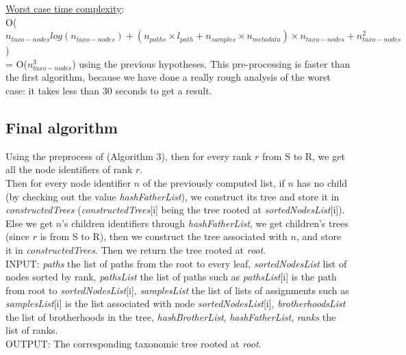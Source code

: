 \documentclass{report}
\begin{document}
\uline{Worst case time complexity}:\\
O($n_{taxo-nodes}log(n_{taxo-nodes}) + (n_{paths} \times l_{path} + n_{samples} \times n_{metadata}) \times n_{taxo-nodes} + n_{taxo-nodes}^{2}$)\\
= O($n_{taxo-nodes}^{3}$) using the previous hypotheses. This pre-processing is faster than the first algorithm, because we have done a really rough analysis of the worst case: it takes less than $30$ seconds to get a result.\\

\subsection{Final algorithm}

Using the preprocess of (Algorithm 3), then for every rank $r$ from S to R, we get all the node identifiers of rank $r$.\\

Then for every node identifier $n$ of the previously computed list, if $n$ has no child (by checking out the value \emph{hashFatherList}), we construct its tree and store it in \emph{constructedTrees} (\emph{constructedTrees}[i] being the tree rooted at \emph{sortedNodesList}[i]).\\

Else we get $n$'s children identifiers through \emph{hashFatherList}, we get children's trees (since $r$ is from S to R), then we construct the tree associated with $n$, and store it in \emph{constructedTrees}. Then we return the tree rooted at \emph{root}.\\

\textsc{INPUT:} \emph{paths} the list of paths from the root to every leaf, \emph{sortedNodesList} list of nodes sorted by rank, \emph{pathsList} the list of paths such as \emph{pathsList}[i] is the path from root to \emph{sortedNodesList}[i], \emph{samplesList} the list of lists of assignments such as \emph{samplesList}[i] is the list associated with node \emph{sortedNodesList}[i], \emph{brotherhoodsList} the list of brotherhoods in the tree, \emph{hashBrotherList}, \emph{hashFatherList}, \emph{ranks} the list of ranks.\\

\textsc{OUTPUT:} The corresponding taxonomic tree rooted at \emph{root}.\\
\end{document}
